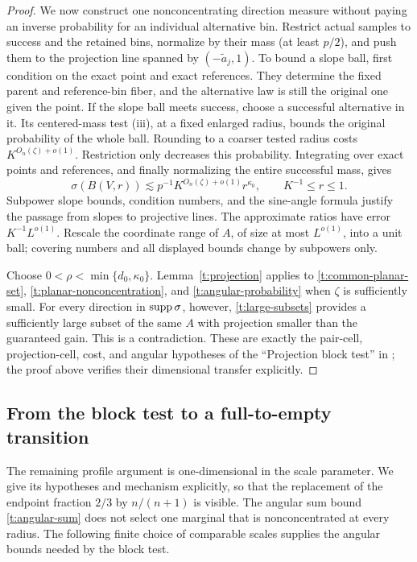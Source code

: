 \begin{proof}
We now construct one nonconcentrating direction measure without paying
an inverse probability for an individual alternative bin.  Restrict
actual samples to success and the retained bins, normalize by their
mass (at least $p/2$), and push them to the projection line spanned by
$(-\widetilde a_j,1)$.  To bound a slope ball, first condition on the
exact point and exact references.  They determine the fixed parent and
reference-bin fiber, and the alternative law is still the original one
given the point.  If the slope ball meets success, choose a successful
alternative in it.  Its centered-mass test (iii), at a fixed enlarged
radius, bounds the original probability of the whole ball.  Rounding
to a coarser tested radius costs $K^{O_n(\zeta)+o(1)}$.  Restriction
only decreases this probability.  Integrating over exact points and
references, and finally normalizing the entire successful mass, gives
\begin{equation}\label{t:angular-probability}
 \sigma(B(V,r))\lesssim p^{-1}K^{O_n(\zeta)+o(1)}r^{\kappa_0},
                    \qquad K^{-1}\le r\le1.
\end{equation}
Subpower slope bounds, condition numbers, and the sine-angle formula
justify the passage from slopes to projective lines.  The approximate
ratios have error $K^{-1}L^{o(1)}$.  Rescale the coordinate range of
$A$, of size at most $L^{o(1)}$, into a unit ball; covering numbers and
all displayed bounds change by subpowers only.

Choose $0<\rho<\min\{d_0,\kappa_0\}$.  Lemma~\ref{t:projection}
applies to \eqref{t:common-planar-set}, \eqref{t:planar-nonconcentration},
and \eqref{t:angular-probability} when $\zeta$ is sufficiently small.
For every direction in $\operatorname{supp}\sigma$, however, \eqref{t:large-subsets}
provides a sufficiently large subset of the same $A$ with projection
smaller than the guaranteed gain.  This is a contradiction.  These
are exactly the pair-cell, projection-cell, cost, and angular hypotheses
of the ``Projection block test'' in \citet[Section~3]{PSE2026}; the
proof above verifies their dimensional transfer explicitly.
\end{proof}

\subsection{From the block test to a full-to-empty transition}

The remaining profile argument is one-dimensional in the scale
parameter.  We give its hypotheses and mechanism explicitly, so that
the replacement of the endpoint fraction $2/3$ by $n/(n+1)$ is visible.
The angular sum bound \eqref{t:angular-sum} does not select one marginal
that is nonconcentrated at every radius.  The following finite choice
of comparable scales supplies the angular bounds needed by the block
test.

